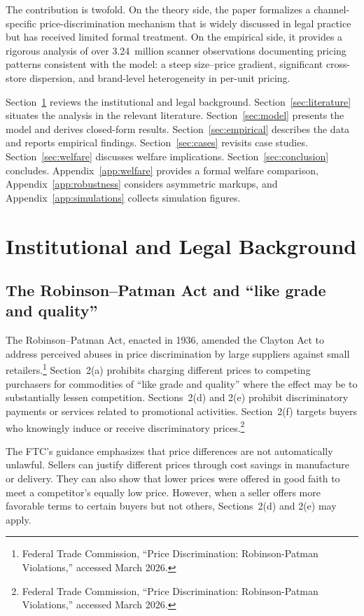 \documentclass[12pt]{article}
\theoremstyle{definition}
\begin{document}
The contribution is twofold.
On the theory side, the paper formalizes a channel-specific price-discrimination mechanism that is widely discussed in legal practice but has received limited formal treatment.
On the empirical side, it provides a rigorous analysis of over 3.24~million scanner observations documenting pricing patterns consistent with the model: a steep size--price gradient, significant cross-store dispersion, and brand-level heterogeneity in per-unit pricing.

Section~\ref{sec:background} reviews the institutional and legal background.
Section~\ref{sec:literature} situates the analysis in the relevant literature.
Section~\ref{sec:model} presents the model and derives closed-form results.
Section~\ref{sec:empirical} describes the data and reports empirical findings.
Section~\ref{sec:cases} revisits case studies.
Section~\ref{sec:welfare} discusses welfare implications.
Section~\ref{sec:conclusion} concludes.
Appendix~\ref{app:welfare} provides a formal welfare comparison, Appendix~\ref{app:robustness} considers asymmetric markups, and Appendix~\ref{app:simulations} collects simulation figures.


\section{Institutional and Legal Background}\label{sec:background}

\subsection{The Robinson--Patman Act and ``like grade and quality''}

The Robinson--Patman Act, enacted in 1936, amended the Clayton Act to address perceived abuses in price discrimination by large suppliers against small retailers.\footnote{Federal Trade Commission, ``Price Discrimination: Robinson-Patman Violations,'' accessed March 2026.}
Section~2(a) prohibits charging different prices to competing purchasers for commodities of ``like grade and quality'' where the effect may be to substantially lessen competition.
Sections~2(d) and 2(e) prohibit discriminatory payments or services related to promotional activities. Section~2(f) targets buyers who knowingly induce or receive discriminatory prices.\footnote{Federal Trade Commission, ``Price Discrimination: Robinson-Patman Violations,'' accessed March 2026.}

The FTC's guidance emphasizes that price differences are not automatically unlawful.
Sellers can justify different prices through cost savings in manufacture or delivery. They can also show that lower prices were offered in good faith to meet a competitor's equally low price.
However, when a seller offers more favorable terms to certain buyers but not others, Sections~2(d) and 2(e) may apply.
\end{document}
